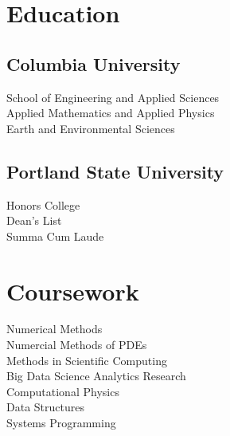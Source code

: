 \documentclass[]{deedy-resume-openfont}
\begin{document}
%
%
\lastupdated

%
%



%
%

\begin{minipage}[t]{0.33\textwidth} 


\section{Education} 
    \subsection{Columbia University}
        School of Engineering and Applied Sciences\\
        Applied Mathematics and Applied Physics\\
        Earth and Environmental Sciences\\
    \sectionsep
    \subsection{Portland State University}
        Honors College \\
        Dean's List \\
        Summa Cum Laude
    \sectionsep
\sectionsep


\section{Coursework}
Numerical Methods \\
Numercial Methods of PDEs \\
Methods in Scientific Computing \\
Big Data Science Analytics Research \\
Computational Physics \\
Data Structures \\
Systems Programming \\
\sectionsep


\end{minipage}
\end{document}
